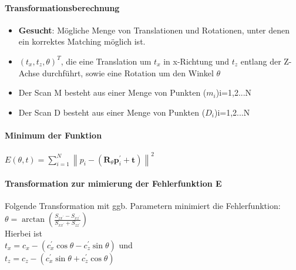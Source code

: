 \paragraph{Transformationsberechnung}
\begin{itemize}
	\item \textbf{Gesucht}: Mögliche Menge von Translationen und Rotationen, unter denen ein korrektes Matching möglich ist.
	\item $(t_x, t_z, \theta)^T$, die eine Translation um $t_x$ in x-Richtung und $t_z$ entlang der Z-Achse durchführt, sowie eine Rotation um den Winkel $\theta$
	\item Der Scan M besteht aus einer Menge von Punkten ($m_i$)i=1,2...N
	\item Der Scan D besteht aus einer Menge von Punkten ($D_i$)i=1,2...N
\end{itemize}
\paragraph{Minimum der Funktion}
$E(\theta, t)=\sum_{i=1}^{N}\left\|p_{i}-\left(\boldsymbol{R}_{\theta} \boldsymbol{p}_{i}^{\prime}+\boldsymbol{t}\right)\right\|^{2}$
\paragraph{Transformation zur mimierung der Fehlerfunktion E}
Folgende Transformation mit ggb. Parametern minimiert die Fehlerfunktion:\\
$\theta=\arctan \left(\frac{S_{z x^{\prime}}-S_{x z^{\prime}}}{S_{x x^{\prime}}+S_{z z^{\prime}}}\right)$
\\
Hierbei ist \\
$t_{x}=c_{x}-\left(c_{x}^{\prime} \cos \theta-c_{z}^{\prime} \sin \theta\right)$ und \\
$t_{z}=c_{z}-\left(c_{x}^{\prime} \sin \theta+c_{z}^{\prime} \cos \theta\right)$


